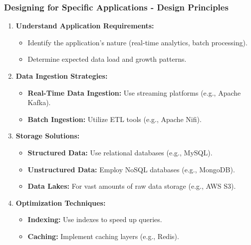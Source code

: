 \documentclass[aspectratio=169]{beamer}
\begin{document}
\begin{frame}[fragile]
    \frametitle{Designing for Specific Applications - Design Principles}
    \begin{enumerate}
        \item \textbf{Understand Application Requirements:}
            \begin{itemize}
                \item Identify the application's nature (real-time analytics, batch processing).
                \item Determine expected data load and growth patterns.
            \end{itemize}
        \item \textbf{Data Ingestion Strategies:}
            \begin{itemize}
                \item \textbf{Real-Time Data Ingestion:} Use streaming platforms (e.g., Apache Kafka).
                \item \textbf{Batch Ingestion:} Utilize ETL tools (e.g., Apache Nifi).
            \end{itemize}
        \item \textbf{Storage Solutions:}
            \begin{itemize}
                \item \textbf{Structured Data:} Use relational databases (e.g., MySQL).
                \item \textbf{Unstructured Data:} Employ NoSQL databases (e.g., MongoDB).
                \item \textbf{Data Lakes:} For vast amounts of raw data storage (e.g., AWS S3).
            \end{itemize}
        \item \textbf{Optimization Techniques:}
            \begin{itemize}
                \item \textbf{Indexing:} Use indexes to speed up queries.
                \item \textbf{Caching:} Implement caching layers (e.g., Redis).
            \end{itemize}
    \end{enumerate}
\end{frame}
\end{document}

